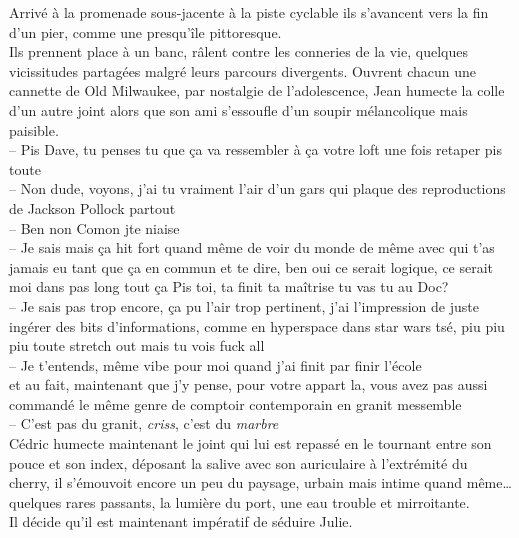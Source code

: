 Arrivé à la promenade sous-jacente à la piste cyclable ils s'avancent vers la
fin d'un pier, comme une presqu'île pittoresque. \\ Ils prennent place à un
banc, râlent contre les conneries de la vie, quelques vicissitudes partagées
malgré leurs parcours divergents. Ouvrent chacun une cannette de Old Milwaukee,
par nostalgie de l'adolescence, Jean humecte la colle d'un autre joint alors que
son ami s'essoufle d'un soupir mélancolique mais paisible.
\\ -- Pis Dave, tu
penses tu que ça va ressembler à ça votre loft une fois retaper pis toute\\ 
-- Non dude, voyons, j'ai tu vraiment l'air d'un gars qui plaque des
reproductions de
Jackson 
Pollock partout \\
-- Ben non Comon jte niaise\\
-- Je sais mais ça hit fort quand même de voir du monde de même avec qui
t'as jamais eu tant que ça en commun et te dire, ben oui ce serait logique,
ce serait moi dans pas long tout ça \textelp{} Pis toi, ta finit ta maîtrise tu
vas tu au Doc?\\
-- Je sais pas trop encore, ça pu l'air trop pertinent, j'ai l'impression
de juste ingérer des bits d'informations, comme en hyperspace dans star wars 
tsé, piu piu piu toute stretch out mais tu vois fuck all\\
-- Je t'entends, même vibe pour moi quand j'ai finit par finir l'école\\

\textelp{} et au fait, maintenant que j'y pense, pour votre appart la, vous
avez pas aussi commandé le même genre de comptoir contemporain en granit
messemble\\
-- C'est pas du granit, \emph{criss}, c'est du \emph{marbre}\\

Cédric humecte maintenant le joint qui lui est repassé en le tournant entre son
pouce et son index, déposant la salive avec son auriculaire à l'extrémité du
cherry, il s'émouvoit encore un peu du paysage, urbain mais intime quand
même\ldots quelques rares passants, la lumière du port, une eau trouble et
mirroitante.\\[1ex] Il décide qu'il est maintenant impératif de séduire Julie.


